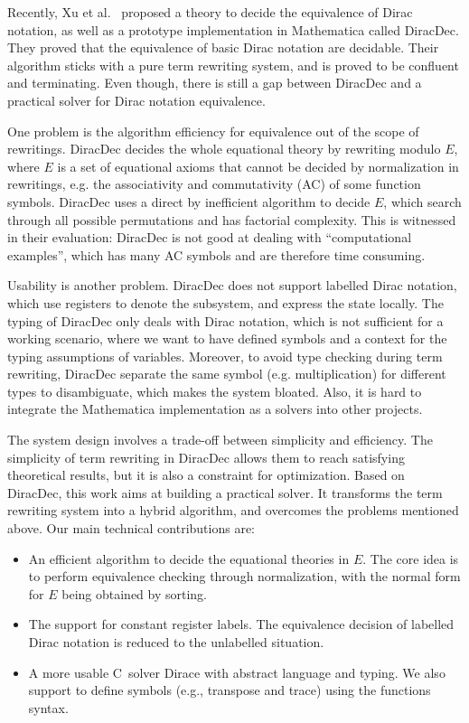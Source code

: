 \documentclass[runningheads]{llncs}
\newcommand{\CC}{C\nolinebreak\hspace{-.05em}\raisebox{.4ex}{\tiny\bf +}\nolinebreak\hspace{-.10em}\raisebox{.4ex}{\tiny\bf +}}
\def\CC{{C\nolinebreak[4]\hspace{-.05em}\raisebox{.4ex}{\tiny\bf ++}}}
\begin{document}
Recently, Xu et al.~\cite{diracdec} proposed a theory to decide the equivalence of Dirac notation, as well as a prototype implementation in Mathematica called DiracDec.
They proved that the equivalence of basic Dirac notation are decidable.
Their algorithm sticks with a pure term rewriting system, and is proved to be confluent and terminating.
Even though, there is still a gap between DiracDec and a practical solver for Dirac notation equivalence.

One problem is the algorithm efficiency for equivalence out of the scope of rewritings. DiracDec decides the whole equational theory by rewriting modulo $E$, where $E$ is a set of equational axioms that cannot be decided by normalization in rewritings, e.g. the associativity and commutativity (AC) of some function symbols. DiracDec uses a direct by inefficient algorithm to decide $E$, which search through all possible permutations and has factorial complexity.
This is witnessed in their evaluation: DiracDec is not good at dealing with ``computational examples'', which has many AC symbols and are therefore time consuming.

Usability is another problem.
DiracDec does not support labelled Dirac notation, which use registers to denote the subsystem, and express the state locally.
The typing of DiracDec only deals with Dirac notation, which is not sufficient for a working scenario, where we want to have defined symbols and a context for the typing assumptions of variables.
Moreover, to avoid type checking during term rewriting, DiracDec separate the same symbol (e.g. multiplication) for different types to disambiguate, which makes the system bloated.
Also, it is hard to integrate the Mathematica implementation as a solvers into other projects.

The system design involves a trade-off between simplicity and efficiency. The simplicity of term rewriting in DiracDec allows them to reach satisfying theoretical results, but it is also a constraint for optimization.
Based on DiracDec, this work aims at building a practical solver. It transforms the term rewriting system into a hybrid algorithm, and overcomes the problems mentioned above. Our main technical contributions are:
\begin{itemize}
    \item An efficient algorithm to decide the equational theories in $E$. The core idea is to perform equivalence checking through normalization, with the normal form for $E$ being obtained by sorting.
    \item The support for constant register labels. The equivalence decision of labelled Dirac notation is reduced to the unlabelled situation.
    \item A more usable \CC\ solver Dirace with abstract language and typing. We also support to define symbols (e.g., transpose and trace) using the functions syntax.
\end{itemize}
\end{document}
